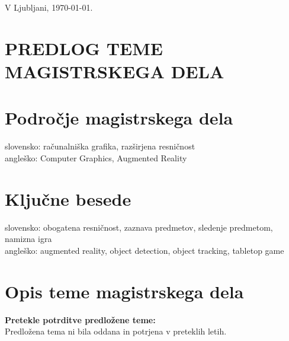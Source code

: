 \documentclass[a4paper, 12pt]{article}
\begin{document}
\bigskip


\hfill V Ljubljani, \today. \\
%

\clearpage
\section{PREDLOG TEME MAGISTRSKEGA DELA}

\section{Področje magistrskega dela}

slovensko: računalniška grafika, razširjena resničnost\\
angleško: Computer Graphics, Augmented Reality

\section{Ključne besede}

slovensko: obogatena resničnost, zaznava predmetov, sledenje predmetom, namizna igra \\
angleško: augmented reality, object detection, object tracking, tabletop game

\section{Opis teme magistrskega dela}

\textbf{Pretekle potrditve predložene teme:}\\
Predložena tema ni bila oddana in potrjena v preteklih letih.
\end{document}

